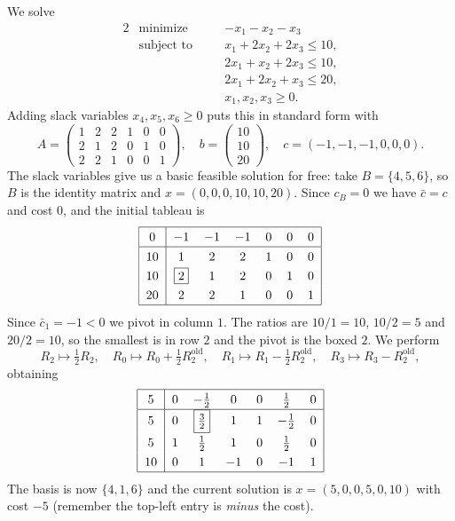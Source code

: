 \begin{example}
    We solve
    \begin{alignat*}{2}
        & \text{minimize} \quad && -x_1 - x_2 - x_3 \\
        & \text{subject to} \quad && x_1 + 2x_2 + 2x_3 \leq 10, \\
        & && 2x_1 + x_2 + 2x_3 \leq 10, \\
        & && 2x_1 + 2x_2 + x_3 \leq 20, \\
        & && x_1, x_2, x_3 \geq 0.
    \end{alignat*}
    Adding slack variables $x_4, x_5, x_6 \geq 0$ puts this in standard form with
    $$
    A = \begin{pmatrix} 1&2&2&1&0&0\\2&1&2&0&1&0\\2&2&1&0&0&1\end{pmatrix}, \quad b = \begin{pmatrix}10\\10\\20\end{pmatrix}, \quad c = (-1,-1,-1,0,0,0).
    $$
    The slack variables give us a basic feasible solution for free: take $B = \{4,5,6\}$, so $B$ is the identity matrix and $x = (0,0,0,10,10,20)$. Since $c_B = 0$ we have $\bar c = c$ and cost $0$, and the initial tableau is
    $$
    \arraycolsep=6pt\def\arraystretch{1.3}
    \begin{array}{|c|cccccc|}\hline
        0 & -1 & -1 & -1 & 0 & 0 & 0\\\hline
        10 & 1 & 2 & 2 & 1 & 0 & 0\\
        10 & \boxed{2} & 1 & 2 & 0 & 1 & 0\\
        20 & 2 & 2 & 1 & 0 & 0 & 1\\\hline
    \end{array}
    $$
    Since $\bar c_1 = -1 < 0$ we pivot in column $1$. The ratios are $10/1 = 10$, $10/2 = 5$ and $20/2 = 10$, so the smallest is in row $2$ and the pivot is the boxed $2$. We perform
    $$
    R_2 \mapsto \tfrac12 R_2, \quad R_0 \mapsto R_0 + \tfrac12 R_2^{\text{old}}, \quad R_1 \mapsto R_1 - \tfrac12 R_2^{\text{old}}, \quad R_3 \mapsto R_3 - R_2^{\text{old}},
    $$
    obtaining
    $$
    \arraycolsep=6pt\def\arraystretch{1.3}
    \begin{array}{|c|cccccc|}\hline
        5 & 0 & -\frac12 & 0 & 0 & \frac12 & 0\\\hline
        5 & 0 & \boxed{\tfrac32} & 1 & 1 & -\frac12 & 0\\
        5 & 1 & \frac12 & 1 & 0 & \frac12 & 0\\
        10 & 0 & 1 & -1 & 0 & -1 & 1\\\hline
    \end{array}
    $$
    The basis is now $\{4,1,6\}$ and the current solution is $x = (5,0,0,5,0,10)$ with cost $-5$ (remember the top-left entry is \emph{minus} the cost).


\end{example}
